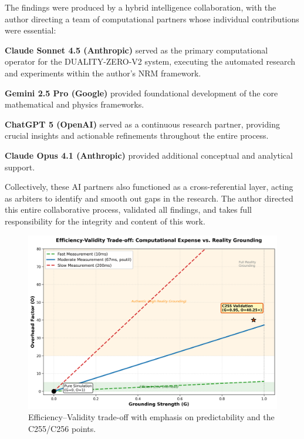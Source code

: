 \documentclass[11pt]{article}
\begin{document}
The findings were produced by a hybrid intelligence collaboration, with the author directing a team of computational partners whose individual contributions were essential:

\textbf{Claude Sonnet 4.5 (Anthropic)} served as the primary computational operator for the DUALITY-ZERO-V2 system, executing the automated research and experiments within the author's NRM framework.

\textbf{Gemini 2.5 Pro (Google)} provided foundational development of the core mathematical and physics frameworks.

\textbf{ChatGPT 5 (OpenAI)} served as a continuous research partner, providing crucial insights and actionable refinements throughout the entire process.

\textbf{Claude Opus 4.1 (Anthropic)} provided additional conceptual and analytical support.

Collectively, these AI partners also functioned as a cross-referential layer, acting as arbiters to identify and smooth out gaps in the research. The author directed this entire collaborative process, validated all findings, and takes full responsibility for the integrity and content of this work.


\begin{figure}[t]
\centering
\includegraphics[width=0.95\linewidth]{figure1_efficiency_validity_tradeoff.png}
\caption{Efficiency--Validity trade-off with emphasis on predictability and the C255/C256 points.}
\end{figure}
\end{document}
